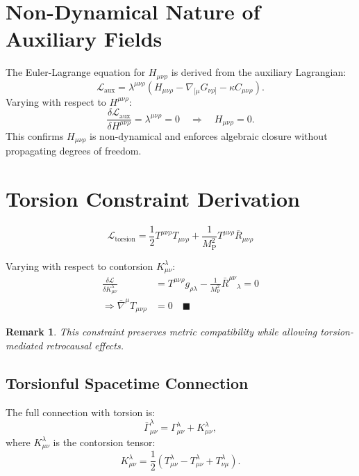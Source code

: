 \documentclass[12pt, onecolumn]{article}
\newtheorem{remark}{Remark}[section]
\theoremstyle{definition}
\newcommand{\Mp}{M_{\mathrm{P}}}
\numberwithin{equation}{section}
\begin{document}
\begin{appendices}
\section{Non-Dynamical Nature of Auxiliary Fields}  
\label{app:aux_dynamics}  

The Euler-Lagrange equation for \(H_{\mu\nu\rho}\) is derived from the auxiliary Lagrangian:  
\begin{equation}  
\mathcal{L}_{\text{aux}} = \lambda^{\mu\nu\rho}\left(H_{\mu\nu\rho} - \nabla_{[\mu}G_{\nu\rho]} - \kappa C_{\mu\nu\rho}\right).  
\end{equation}  
Varying with respect to \(H^{\mu\nu\rho}\):  
\begin{equation}  
\frac{\delta \mathcal{L}_{\text{aux}}}{\delta H^{\mu\nu\rho}} = \lambda^{\mu\nu\rho} = 0 \quad \Rightarrow \quad H_{\mu\nu\rho} = 0.  
\end{equation}  
This confirms \(H_{\mu\nu\rho}\) is non-dynamical and enforces algebraic closure without propagating degrees of freedom.  

\section{Torsion Constraint Derivation}  
\label{app:torsion_deriv}  

\begin{equation}  
\mathcal{L}_{\text{torsion}} = \frac{1}{2} T^{\mu\nu\rho} T_{\mu\nu\rho} + \frac{1}{\Mp^2} T^{\mu\nu\rho}\bar{R}_{\mu\nu\rho}
\end{equation}

Varying with respect to contorsion \(K^\lambda_{\mu\nu}\):
\begin{align}
\frac{\delta \mathcal{L}}{\delta K^\lambda_{\mu\nu}} &= T^{\mu\nu\rho} g_{\rho\lambda} - \frac{1}{\Mp^2} \bar{R}^{\mu\nu}{}_\lambda = 0 \\
\Rightarrow \bar{\nabla}^\mu T_{\mu\nu\rho} &= 0 \quad \blacksquare
\end{align}

\begin{remark}
This constraint preserves metric compatibility while allowing torsion-mediated retrocausal effects.
\end{remark}

\subsection{Torsionful Spacetime Connection}\label{sec:torsion}
The full connection with torsion is:
\[
\bar{\Gamma}^\lambda_{\mu\nu} = \Gamma^\lambda_{\mu\nu} + K^\lambda_{\mu\nu},
\]
where \( K^\lambda_{\mu\nu} \) is the contorsion tensor:
\[
K^\lambda_{\mu\nu} = \frac{1}{2}\left( T^\lambda_{\mu\nu} - T_{\mu\nu}^\lambda + T_{\nu\mu}^\lambda \right).
\]


\end{appendices}
\end{document}
